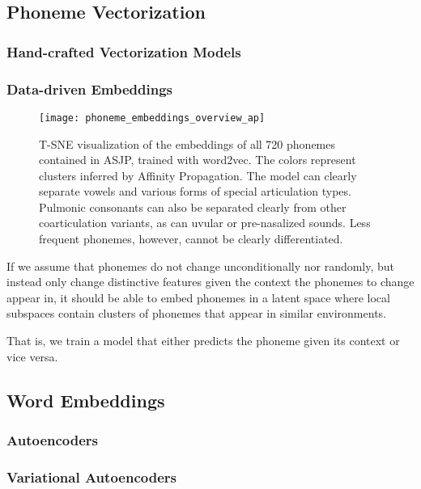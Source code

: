 \documentclass[8pt]{article}
\begin{document}
\subsection{Phoneme Vectorization}
\subsubsection{Hand-crafted Vectorization Models}
\subsubsection{Data-driven Embeddings}

\begin{figure}[htbp]
\begin{center}
\texttt{[image: phoneme\_embeddings\_overview\_ap]} 
\caption{T-SNE visualization of the embeddings of all 720 phonemes contained in ASJP, trained with word2vec. The colors represent clusters inferred by Affinity Propagation. The model can clearly separate vowels and various forms of special articulation types. Pulmonic consonants can also be separated clearly from other coarticulation variants, as can uvular or pre-nasalized sounds. Less frequent phonemes, however, cannot be clearly differentiated. }
\label{default}
\end{center}
\end{figure}



If we assume that phonemes do not change unconditionally nor randomly, but instead only change distinctive features given the context the phonemes to change appear in, it should be able to embed phonemes in a latent space where local subspaces contain clusters of phonemes that appear in similar environments. 

That is, we train a model that either predicts the phoneme given its context or vice versa.  
\subsection{Word Embeddings}

\subsubsection{Autoencoders}
\subsubsection{Variational Autoencoders}
\end{document}

